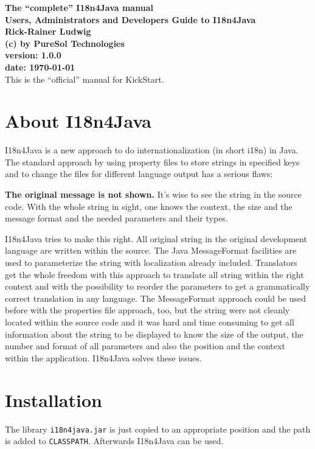 \documentclass[a4paper,10pt]{report}
\newcommand{\TITLE}{The ``complete'' I18n4Java manual}
\newcommand{\SUBTITLE}{Users, Administrators and Developers Guide to 
I18n4Java}
\newcommand{\AUTHOR}{Rick-Rainer Ludwig}
\newcommand{\DATE}{\today}
\newcommand{\VERSION}{1.0.0}
\newcommand{\COMPANY}{PureSol Technologies}
\begin{document}
\pagestyle{headings}

\newcommand{\bs}{\textbackslash}

\begin{titlepage}
	{
	\centering
	\textbf{\Huge \TITLE}\\[1cm]
	\textbf{\Large \SUBTITLE}\\[2cm]
	\textbf{\AUTHOR}\\
	\textbf{(c) by \COMPANY}\\[1cm]
	\textbf{version: \VERSION}\\
	\textbf{date: \DATE}\\[1cm]
	}
        This is the ``official'' manual for KickStart.
\end{titlepage}

\tableofcontents
\listoffigures
\listoftables

\chapter{About I18n4Java}
I18n4Java is a new approach to do internationalization (in short i18n) in Java. The standard approach by using property files to store strings in specified keys and to change the files for different language output has a serious flaws:

 \textbf{The original message is not shown.} It's wise to see the string in the source code. With the whole string in sight, one knows the context, the size and the message format and the needed parameters and their types.

I18n4Java tries to make this right. All original string in the original development language are written within the source. The Java MessageFormat facilities are used to parameterize the string with localization already included. Translators get the whole freedom with this approach to translate all string within the right context and with the possibility to reorder the parameters to get a grammatically correct translation in any language. The MessageFormat approach could be used before with the properties file approach, too, but the string were not cleanly located within the source code and it was hard and time consuming to get all information about the string to be displayed to know the size of the output, the number and format of all parameters and also the position and the context within the application. I18n4Java solves these issues.


\chapter{Installation}
The library \texttt{i18n4java.jar} is just copied to an appropriate position and the path is added to \texttt{CLASSPATH}. Afterwards I18n4Java can be used.
\end{document}
